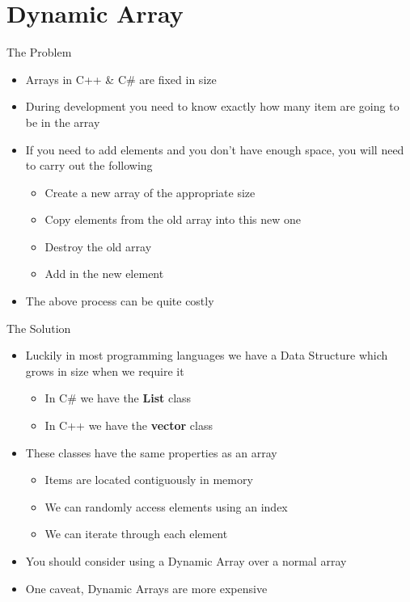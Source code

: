 \part{Dynamic Array}
\frame{\partpage}

\begin{frame}{The Problem}
	\begin{itemize}
		\pause \item Arrays in C++ \& C\# are fixed in size
		\pause \item During development you need to know exactly how many item are going to be in the array
		\pause \item If you need to add elements and you don't have enough space, you will need to carry out the following
		\begin{itemize}
			\pause \item Create a new array of the appropriate size 
			\pause \item Copy elements from the old array into this new one
			\pause \item Destroy the old array
			\pause \item Add in the new element
		\end{itemize}
		\pause \item The above process can be quite costly
	\end{itemize}
\end{frame}

\begin{frame}{The Solution}
	\begin{itemize}
		\pause \item Luckily in most programming languages we have a Data Structure which grows in size when we require it 
		\begin{itemize}
			\pause \item In C\# we have the \textbf{List} class
			\pause \item In C++ we have the \textbf{vector} class
		\end{itemize}
		\pause \item These classes have the same properties as an array
		\begin{itemize}
			\pause \item Items are located contiguously in memory 
			\pause \item We can randomly access elements using an index
			\pause \item We can iterate through each element
		\end{itemize}
		\pause \item You should consider using a Dynamic Array over a normal array
		\pause \item One caveat, Dynamic Arrays are more expensive
	\end{itemize}
\end{frame}


